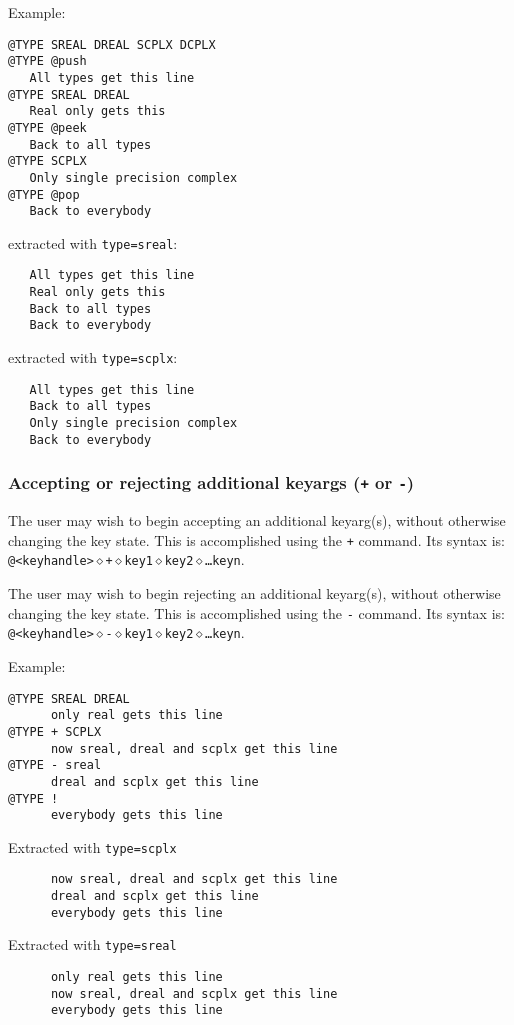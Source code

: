 \noindent
Example:
\begin{verbatim}
@TYPE SREAL DREAL SCPLX DCPLX
@TYPE @push
   All types get this line
@TYPE SREAL DREAL
   Real only gets this
@TYPE @peek
   Back to all types
@TYPE SCPLX
   Only single precision complex
@TYPE @pop
   Back to everybody
\end{verbatim}

\noindent
extracted with {\tt type=sreal}:
\begin{verbatim}
   All types get this line
   Real only gets this
   Back to all types
   Back to everybody
\end{verbatim}

\noindent
extracted with {\tt type=scplx}:
\begin{verbatim}
   All types get this line
   Back to all types
   Only single precision complex
   Back to everybody
\end{verbatim}

\subsubsection{Accepting or rejecting additional keyargs ({\tt +} or {\tt -})}
The user may wish to begin accepting an additional keyarg(s), without otherwise
changing the key state.  This is accomplished using the {\tt +} command.
Its syntax is: \\
{\tt @<keyhandle>$\diamond$+$\diamond$key1$\diamond$key2$\diamond$\ldots keyn}.

The user may wish to begin rejecting an additional keyarg(s), without otherwise
changing the key state.  This is accomplished using the {\tt -} command.
Its syntax is: \\
{\tt @<keyhandle>$\diamond$-$\diamond$key1$\diamond$key2$\diamond$\ldots keyn}.

\noindent
Example:
\begin{verbatim}
@TYPE SREAL DREAL
      only real gets this line
@TYPE + SCPLX
      now sreal, dreal and scplx get this line
@TYPE - sreal
      dreal and scplx get this line
@TYPE !
      everybody gets this line
\end{verbatim}

\noindent
Extracted with {\tt type=scplx}
\begin{verbatim}
      now sreal, dreal and scplx get this line
      dreal and scplx get this line
      everybody gets this line
\end{verbatim}

\noindent
Extracted with {\tt type=sreal}
\begin{verbatim}
      only real gets this line
      now sreal, dreal and scplx get this line
      everybody gets this line
\end{verbatim}

